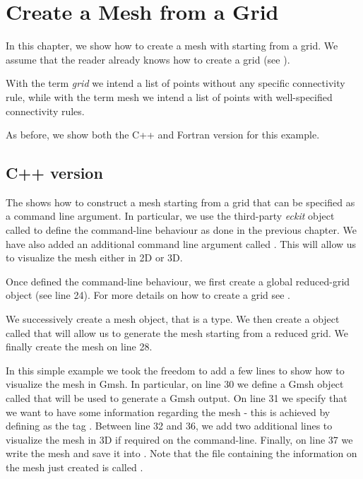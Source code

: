\chapter{Create a Mesh from a Grid}
In this chapter, we show how to create a mesh with \Atlas 
starting from a grid. We assume that the reader already 
knows how to create a grid (see ). 
% 
\begin{notebox}
With the term \textit{grid} we intend a list of points 
without any specific connectivity rule, while with the 
term mesh we intend a list of points with well-specified 
connectivity rules.
\end{notebox}
%
As before, we show both the C++ and Fortran version 
for this example.


\section{C++ version}
The  shows how to construct a mesh 
starting from a grid that can be specified as a command 
line argument. In particular, we use the third-party 
\textit{eckit} object called  to define 
the command-line behaviour as done in the previous chapter. 
We have also added an additional command line argument 
called . This will allow us to 
visualize the mesh either in 2D or 3D. 
%

%
Once defined the command-line behaviour, we first create 
a global reduced-grid object (see line 24). For more 
details on how to create a grid see .

We successively create a mesh object,  
that is a  type. We then create a 
 object called 
that will allow us to generate the mesh starting from
a reduced grid. We finally create the mesh on line 28.

In this simple example we took the freedom to add a few 
lines to show how to visualize the mesh in Gmsh. In particular, 
on line 30 we define a Gmsh object called  that 
will be used to generate a Gmsh output. On line 31 we specify 
that we want to have some information regarding the mesh - this 
is achieved by defining as  the tag .
Between line 32 and 36, we add two additional lines to visualize 
the mesh in 3D if required on the command-line.
Finally, on line 37 we write the mesh and save it into .
Note that the file containing the information on the mesh 
just created is called .

